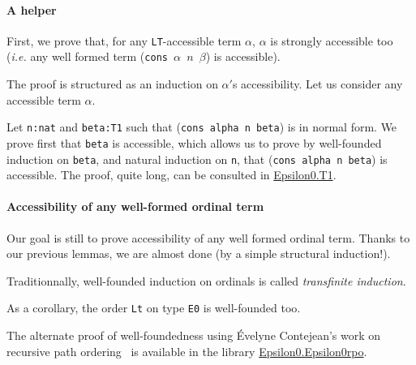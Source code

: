 \label{sec:orgheadline81}
\label{proof-wf-epsilon0}
\paragraph{A helper}
\label{sec:orgheadline79}

First, we prove that, for  any \texttt{LT}-accessible term $\alpha$, $\alpha$ is 
strongly accessible too (\emph{i.e.} any well formed
term (\texttt{cons $\alpha$ $n$ $\beta$})  is accessible).

The proof is structured as an induction on $\alpha'$s accessibility. Let us consider
any  accessible term $\alpha$.





Let \texttt{n:nat} and \texttt{beta:T1} such that (\texttt{cons alpha n beta}) is in normal form. 
We prove first that \texttt{beta} is accessible,  which allows us to prove by well-founded induction on \texttt{beta}, 
and natural induction on \texttt{n}, that (\texttt{cons alpha n beta}) is accessible.
The proof, quite long, can be consulted in \href{../theories/html/hydras.Epsilon0.T1.html}{Epsilon0.T1}.

\paragraph{Accessibility of any well-formed ordinal term}
\label{sec:orgheadline80}

Our goal is still to prove accessibility of any well formed ordinal term.
Thanks to our previous lemmas, we are almost done (by a simple structural induction!).







Traditionnally, well-founded induction on ordinals is called \emph{transfinite induction}.


As a corollary, the order \texttt{Lt} on type \texttt{E0} is well-founded too.



\begin{remark}
\label{remark:a3pat}
The alternate proof of well-foundedness using \'Evelyne Contejean's work on
    recursive path ordering~\cite{DershowitzRPO, a3pat} is available in the
    library \href{../theories/html/hydras.Epsilon0.Epsilon0rpo.html}{Epsilon0.Epsilon0rpo}.
 \end{remark}



